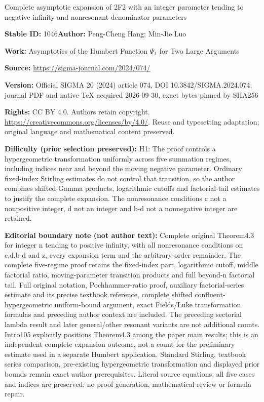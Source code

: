 \documentclass[11pt]{article}
\numberwithin{equation}{section}
\numberwithin{equation}{section}
\begin{document}
\begin{center}\Large Complete asymptotic expansion of 2F2 with an integer parameter tending to negative infinity and nonresonant denominator parameters\end{center}
\noindent\textbf{Stable ID:} 1046\quad\textbf{Author:} Peng-Cheng Hang; Min-Jie Luo\par
\noindent\textbf{Work:} Asymptotics of the Humbert Function $\Psi_1$ for Two Large Arguments\par
\noindent\textbf{Source:} \url{https://sigma-journal.com/2024/074/}\par
\noindent\textbf{Version:} Official SIGMA 20 (2024) article 074, DOI 10.3842/SIGMA.2024.074; journal PDF and native TeX acquired 2026-09-30, exact bytes pinned by SHA256\par
\noindent\textbf{Rights:} CC BY 4.0. Authors retain copyright. \url{https://creativecommons.org/licenses/by/4.0/}. Reuse and typesetting adaptation; original language and mathematical content preserved.\par
\noindent\textbf{Difficulty (prior selection preserved):} {\CJKfont H1: The proof controls a hypergeometric transformation uniformly across five summation regimes, including indices near and beyond the moving negative parameter. Ordinary fixed-index Stirling estimates do not control that transition, so the author combines shifted-Gamma products, logarithmic cutoffs and factorial-tail estimates to justify the complete expansion. The nonresonance conditions c not a nonpositive integer, d not an integer and b-d not a nonnegative integer are retained.}\par
\medskip\noindent\textbf{Editorial boundary note (not author text):} Complete original Theorem4.3 for integer n tending to positive infinity, with all nonresonance conditions on c,d,b-d and z, every expansion term and the arbitrary-order remainder. The complete five-regime proof retains the fixed-index part, logarithmic cutoff, middle factorial ratio, moving-parameter transition products and full beyond-n factorial tail. Full original notation, Pochhammer-ratio proof, auxiliary factorial-series estimate and its precise textbook reference, complete shifted confluent-hypergeometric uniform-bound argument, exact Fields/Luke transformation formulas and preceding author context are included. The preceding sectorial lambda result and later general/other resonant variants are not additional counts. Intro105 explicitly positions Theorem4.3 among the paper main results; this is an independent complete expansion outcome, not a count for the preliminary estimate used in a separate Humbert application. Standard Stirling, textbook series comparison, pre-existing hypergeometric transformation and displayed prior bounds remain exact author prerequisites. Literal source equations, all five cases and indices are preserved; no proof generation, mathematical review or formula repair.\par
\end{document}
